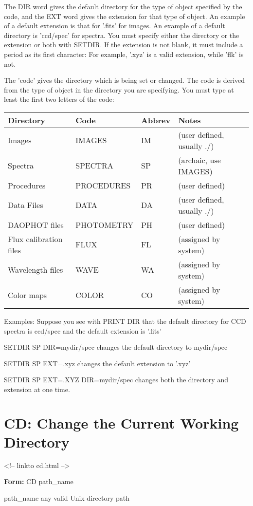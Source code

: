 The DIR word gives the default directory for the type of object specified
by the code, and the EXT word gives the extension for that type of object.
An example of a default extension is that for '.fits' for images.  An
example of a default directory is 'ccd/spec' for spectra.  You must specify
either the directory or the extension or both with SETDIR. If the extension
is not blank, it must include a period as its first character: For example,
'.xyz' is a valid extension, while 'flk' is not.

The 'code' gives the directory which is being set or changed. The code is
derived from the type of object in the directory you are specifying.  You
must type at least the first two letters of the code:

\begin{center}
\begin{tabular}{llll}
Directory&Code&Abbrev&Notes\\
\hline
Images&IMAGES&IM&(user defined, usually ./)\\
Spectra&SPECTRA&SP&(archaic, use IMAGES)\\
Procedures&PROCEDURES&PR&(user defined)\\
Data Files&DATA&DA&(user defined, usually ./)\\
DAOPHOT files&PHOTOMETRY&PH&(user defined)\\
Flux calibration files&FLUX&FL&(assigned by system)\\
Wavelength files&WAVE&WA&(assigned by system)\\
Color maps&COLOR&CO&(assigned by system)\\
\hline
\end{tabular}
\end{center}

Examples: Suppose you see with PRINT DIR that the default directory for CCD
spectra is ccd/spec and the default extension is '.fits'
\begin{example}
  \item[SETDIR SP DIR=mydir/spec\hfill]{changes the default directory
       to mydir/spec}
  \item[SETDIR SP EXT=.xyz\hfill]{changes the default extension to '.xyz'}
  \item[SETDIR SP EXT=.XYZ DIR=mydir/spec\hfill]{changes both the
       directory and extension at one time.}
\end{example}

\section{CD: Change the Current Working Directory}
\begin{rawhtml}
<!-- linkto cd.html -->
\end{rawhtml}
\begin{command} 
  \item[\textbf{Form: } CD path\_name\hfill]{}
  \item[path\_name]{any valid Unix directory path}
\end{command}
 
